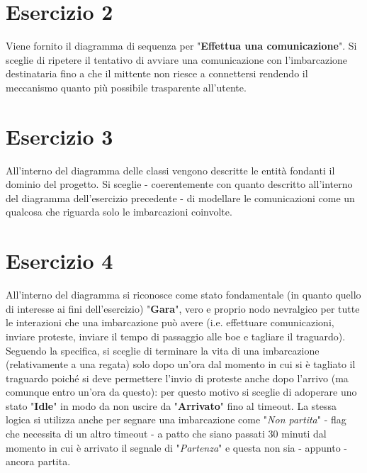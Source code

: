 \documentclass[10pt, openany, landscape]{book}
\begin{document}
\section{Esercizio 2}
Viene fornito il diagramma di sequenza per "\textbf{Effettua una comunicazione}". Si sceglie di ripetere il tentativo di
avviare una comunicazione con l'imbarcazione destinataria fino a che il mittente non riesce a connettersi rendendo il
meccanismo quanto pi\`u possibile trasparente all'utente.

\pagebreak

\section{Esercizio 3}
All'interno del diagramma delle classi vengono descritte le entit\`a fondanti il dominio del progetto. Si sceglie - coerentemente
con quanto descritto all'interno del diagramma dell'esercizio precedente - di modellare le comunicazioni come un qualcosa che
riguarda solo le imbarcazioni coinvolte.

\pagebreak

\section{Esercizio 4}
All'interno del diagramma si riconosce come stato fondamentale (in quanto quello di interesse ai fini dell'esercizio)
"\textbf{Gara}", vero e proprio nodo nevralgico per tutte le interazioni che una imbarcazione pu\`o avere (i.e. effettuare
comunicazioni, inviare proteste, inviare il tempo di passaggio alle boe e tagliare il traguardo). Seguendo la specifica, si
sceglie di terminare la vita di una imbarcazione (relativamente a una regata) solo dopo un'ora dal momento in cui si \`e
tagliato il traguardo poich\'e si deve permettere l'invio di proteste anche dopo l'arrivo (ma comunque entro un'ora da questo):
per questo motivo si sceglie di adoperare uno stato "\textbf{Idle}" in modo da non uscire da "\textbf{Arrivato}"
fino al timeout. La stessa logica si utilizza anche per segnare una imbarcazione come "\textit{Non partita}" - flag che necessita
di un altro timeout - a patto che siano passati 30 minuti dal momento in cui \`e arrivato il segnale di "\textit{Partenza}"
e questa non sia - appunto - ancora partita.

\pagebreak
\end{document}

